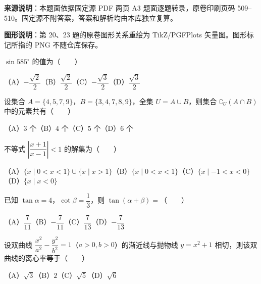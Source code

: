 


\begin{gktip}
\textbf{来源说明}：本题面依据固定源 PDF 两页 A3 题面逐题转录，原卷印刷页码 509–510。固定源不附答案，答案和解析均由本库独立复算。

\textbf{图形说明}：第 20、23 题的原卷图形关系重绘为 TikZ/PGFPlots 矢量图。图形标记所指的 PNG 不随仓库保存。
\end{gktip}


\begin{question}
$\sin585^\circ$ 的值为\mbox{（　　）}

（A）$-\dfrac{\sqrt2}{2}$\quad（B）$\dfrac{\sqrt2}{2}$\quad（C）$-\dfrac{\sqrt3}{2}$\quad（D）$\dfrac{\sqrt3}{2}$

\end{question}
\begin{question}
设集合 $A=\{4,5,7,9\}$，$B=\{3,4,7,8,9\}$，全集 $U=A\cup B$，则集合 $\complement_U(A\cap B)$ 中的元素共有\mbox{（　　）}

（A）$3$ 个\quad（B）$4$ 个\quad（C）$5$ 个\quad（D）$6$ 个

\end{question}
\begin{question}
不等式 $\left|\dfrac{x+1}{x-1}\right|<1$ 的解集为\mbox{（　　）}

（A）$\{x\mid0<x<1\}\cup\{x\mid x>1\}$\quad（B）$\{x\mid0<x<1\}$\quad（C）$\{x\mid-1<x<0\}$\quad（D）$\{x\mid x<0\}$

\end{question}
\begin{question}
已知 $\tan\alpha=4$，$\cot\beta=\dfrac13$，则 $\tan(\alpha+\beta)=$\mbox{（　　）}

（A）$\dfrac7{11}$\quad（B）$-\dfrac7{11}$\quad（C）$\dfrac7{13}$\quad（D）$-\dfrac7{13}$

\end{question}
\begin{question}
设双曲线 $\dfrac{x^2}{a^2}-\dfrac{y^2}{b^2}=1$（$a>0,b>0$）的渐近线与抛物线 $y=x^2+1$ 相切，则该双曲线的离心率等于\mbox{（　　）}

（A）$\sqrt3$\quad（B）$2$\quad（C）$\sqrt5$\quad（D）$\sqrt6$

\end{question}
